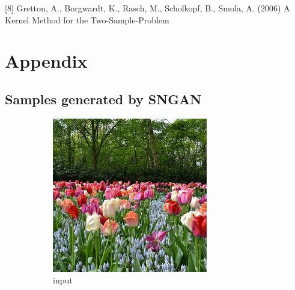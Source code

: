 \documentclass{article}
\begin{document}
[8] Gretton, A., Borgwardt, K., Rasch, M., Scholkopf, B., Smola, A. (2006) A Kernel Method for the Two-Sample-Problem

\newpage
\section*{Appendix}

\subsection*{Samples generated by SNGAN}
\begin{figure}[h!]
    \caption{Dataset Flower}
     \centering
     \begin{subfigure}[b]{0.24\textwidth}
         \centering
         \includegraphics[width=\textwidth]{illustration/flower_input.jpeg}
         \caption{input}
     \end{subfigure}
     \begin{subfigure}[b]{0.24\textwidth}
         \centering

\end{subfigure}
\end{figure}
\end{document}
